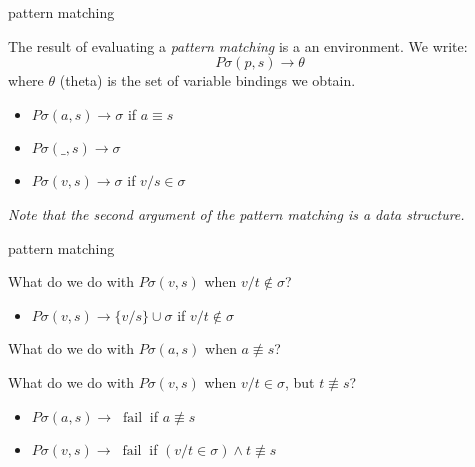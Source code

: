 \begin{frame}{pattern matching}

The result of evaluating a {\em pattern matching} is a an
environment.  We write: $$P\sigma(p,s) \rightarrow \theta$$ where
$\theta$ (theta) is the set of variable bindings we obtain.

\pause\vspace{10pt}

\begin{itemize}
  \pause \item $P\sigma(a,s) \rightarrow \sigma$  if  $a \equiv s$
  \pause \item $P\sigma(\_,s) \rightarrow \sigma$  
  \pause \item $P\sigma(v,s) \rightarrow \sigma$  if \pause $ v/s \in \sigma $
\end{itemize}

\pause\vspace{10pt}

{\em Note that the second argument of the pattern matching is a data structure.}


\end{frame}

\begin{frame}{pattern matching}

\pause What do we do with $P\sigma(v,s)$ when $v/t \not\in \sigma$?

\vspace{10pt}\pause 
\begin{itemize}
 \pause \item $P\sigma(v,s) \rightarrow \lbrace v/s \rbrace \cup \sigma$ if \pause $ v/t \not\in \sigma$
\end{itemize}

\pause\vspace{20pt} What do we do with $P\sigma(a,s)$ when $a \not\equiv s$?

\pause\vspace{20pt} What do we do with $P\sigma(v,s)$ when $v/t \in \sigma$,  but $t \not\equiv s$?

\vspace{10pt}\pause 
\begin{itemize}
  \pause \item $P\sigma(a, s) \rightarrow$ \pause $\  \mathrm{fail}\ $ if $a \not\equiv s$
  \pause \item $P\sigma(v, s) \rightarrow$ \pause $\  \mathrm{fail}\ $ if $(v/t \in \sigma) \wedge t \not\equiv s$
\end{itemize}


\end{frame}


